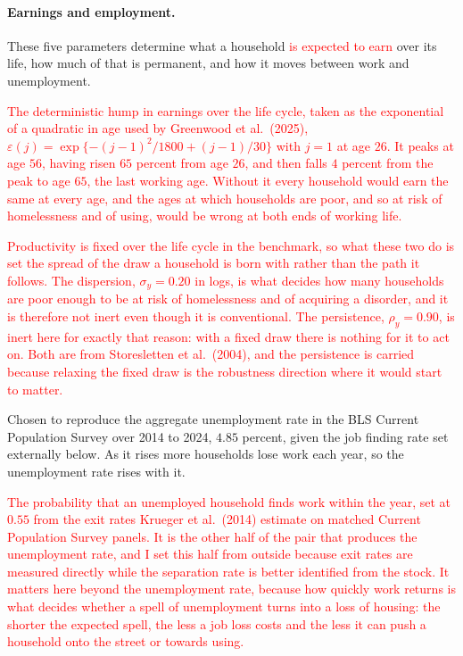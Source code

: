 \documentclass[10pt]{article}
\begin{document}
\paragraph{Earnings and employment.} These five parameters determine what a household \textcolor{red}{is expected to earn} over its life, how much of that is permanent, and how it moves between work and unemployment.
\begin{description}\setlength{\itemsep}{0.25em}\setlength{\parskip}{0em}
\item[$\varepsilon(j)$, the age profile of efficiency.] \textcolor{red}{The deterministic hump in
earnings over the life cycle, taken as the exponential of a quadratic in age used by
Greenwood et al.\ (2025), $\varepsilon(j)=\exp\{-(j-1)^2/1800+(j-1)/30\}$ with $j=1$
at age $26$. It peaks at age $56$, having risen $65$ percent from age $26$, and then
falls $4$ percent from the peak to age $65$, the last working age. Without it every
household would earn the same at every age, and the ages at which households are
poor, and so at risk of homelessness and of using, would be wrong at both ends of
working life.}

\item[$\rho_y$ and $\sigma_y$, permanent productivity.] \textcolor{red}{Productivity is fixed
over the life cycle in the benchmark, so what these two do is set the spread of the
draw a household is born with rather than the path it follows. The dispersion,
$\sigma_y=0.20$ in logs, is what decides how many households are poor enough to be
at risk of homelessness and of acquiring a disorder, and it is therefore not inert
even though it is conventional. The persistence, $\rho_y=0.90$, is inert here for
exactly that reason: with a fixed draw there is nothing for it to act on. Both are
from Storesletten et al.\ (2004), and the persistence is carried because relaxing
the fixed draw is the robustness direction where it would start to matter.}

\item[$\bar\pi^{eu}$, the job separation rate.] Chosen to reproduce the aggregate
unemployment rate in the BLS Current Population Survey over 2014 to 2024,
$4.85$ percent, given the
job finding rate set externally below. As it rises more households lose work each year, so the unemployment rate rises with it.
\item[$\bar\pi^{ue}$, the annual job finding rate.] \textcolor{red}{The probability that an
unemployed household finds work within the year, set at $0.55$ from the exit rates
Krueger et al.\ (2014) estimate on matched Current Population Survey panels. It is
the other half of the pair that produces the unemployment rate, and I set this half
from outside because exit rates are measured directly while the separation rate is
better identified from the stock. It matters here beyond the unemployment rate,
because how quickly work returns is what decides whether a spell of unemployment
turns into a loss of housing: the shorter the expected spell, the less a job loss
costs and the less it can push a household onto the street or towards using.}

\end{description}
\end{document}

